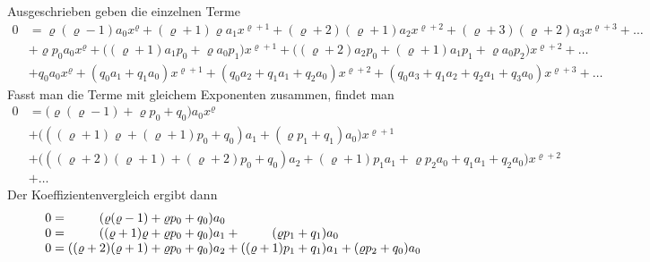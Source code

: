 Ausgeschrieben geben die einzelnen Terme
\begin{align*}
0
&=
\varrho(\varrho-1)a_0x^\varrho
+
(\varrho+1)\varrho a_1x^{\varrho+1}
+
(\varrho+2)(\varrho+1)a_2x^{\varrho+2}
+
(\varrho+3)(\varrho+2)a_3x^{\varrho+3}
+
\dots
\\
&+
\varrho p_0 a_0 x^{\varrho}
+
\bigl((\varrho +1)a_1p_0 + \varrho a_0 p_1\bigr) x^{\varrho+1}
+
\bigl((\varrho +2)a_2p_0 + (\varrho+1)a_1p_1 + \varrho a_0 p_2\bigr) x^{\varrho+2}
+
\dots
\\
&+
q_0a_0x^{\varrho}
+
(q_0a_1+q_1a_0) x^{\varrho+1}
+
(q_0a_2+q_1a_1+q_2a_0) x^{\varrho+2}
+
(q_0a_3+q_1a_2+q_2a_1+q_3a_0) x^{\varrho+3}
+
\dots
\end{align*}
Fasst man die Terme mit gleichem Exponenten zusammen, findet man
\begin{align*}
0
&=
\bigl(
\varrho(\varrho-1) + \varrho p_0 + q_0
\bigr)a_0 x^{\varrho}
\\
&+
\bigl(
((\varrho+1)\varrho 
+
(\varrho+1) p_0
+
q_0) a_1
+
( \varrho p_1 + q_1)a_0
\bigr)x^{\varrho+1}
\\
&+
\bigl(
(
(\varrho+2)(\varrho+1)
+
(\varrho+2)p_0
+
q_0)a_2
+
(\varrho+1)p_1 a_1
+
\varrho p_2 a_0
+q_1a_1+q_2a_0
\bigr)x^{\varrho+2}
\\
&+\dots
\end{align*}
Der Koeffizientenvergleich ergibt dann
\[
\renewcommand{\arraycolsep}{0pt}
\begin{array}{rcrlcrlcrl}
0&\mathstrut=\mathstrut&(\varrho(\varrho-1)     + \varrho p_0 + q_0)&a_0
	& &                 &
		&&
\\
0&\mathstrut=\mathstrut&((\varrho+1)\varrho     + \varrho p_0 + q_0)&a_1
	&\mathstrut+\mathstrut&(\varrho p_1+q_1)&a_0
		& &
\\
0&\mathstrut=\mathstrut&((\varrho+2)(\varrho+1) + \varrho p_0 + q_0)&a_2
	&\mathstrut+\mathstrut&((\varrho+1)p_1+q_1)&a_1
		&\mathstrut+\mathstrut&(\varrho p_2+q_0)&a_0
\end{array}
\]

